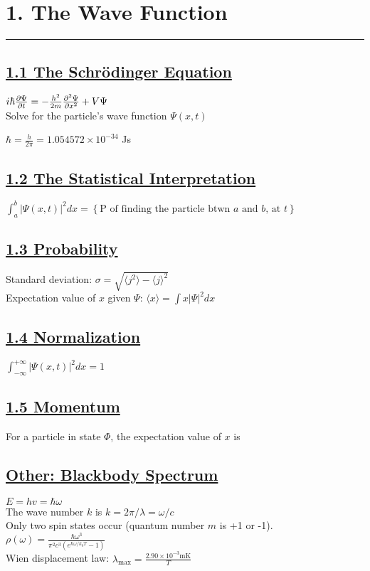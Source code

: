 \section{1. The Wave Function} \thinspace \hrule height 0.3pt

\subsection{\underline{1.1 The Schr\"{o}dinger Equation}}

$i \hbar \pdv{\Psi}{t} = - \frac{h^2}{2m} \pdv[2]{\Psi}{x} + V \Psi$ \\
Solve for the particle's wave function $\Psi(x, t)$

$\hbar = \frac{h}{2\pi} = 1.054572 \times 10^{-34}$ Js \\

\subsection{\underline{1.2 The Statistical Interpretation}}

$\int_{a}^{b} |\Psi(x, t)|^2 dx = \left\{ \textrm{P of finding the particle btwn $a$ and $b$, at $t$} \right\}$ \\

\subsection{\underline{1.3 Probability}}
Standard deviation: $\sigma = \sqrt{\langle j^2 \rangle - \langle j \rangle ^2}$ \\
Expectation value of $x$ given $\Psi$: $\langle x \rangle = \int x |\Psi|^2 dx$

\subsection{\underline{1.4 Normalization}}

$\int_{-\infty}^{+\infty} |\Psi (x, t)|^2 dx = 1$

\subsection{\underline{1.5 Momentum}}
For a particle in state $\Phi$, the expectation value of $x$ is \\

\subsection{\underline{Other: Blackbody Spectrum}}
$E = hv = \hbar \omega$ \\
The wave number $k$ is $k = 2 \pi / \lambda = \omega / c$ \\
Only two spin states occur (quantum number $m$ is +1 or -1). \\

$\rho(\omega) = \frac{\hbar \omega^3}{\pi^2 c^3 (e^{\hbar \omega / {k_b T}} - 1)}$ \\
Wien displacement law: $\lambda_{\text{max}} = \frac{2.90 \times 10^{-3} \text{mK}}{T}$ \\
